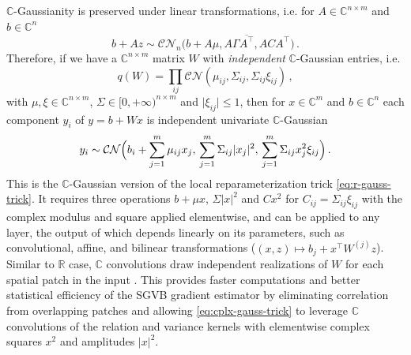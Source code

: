\documentclass[a4paper,10pt,twocolumn]{article}
\newcommand{\real}{\mathbb{R}}
\newcommand{\cplx}{\mathbb{C}}
\newcommand{\conj}[1]{\overline{#1}}
\begin{document}
$\cplx$-Gaussianity is preserved under linear transformations, i.e. for $
  A \in \cplx^{n \times m}
$ and $b \in \cplx^{n}$
\begin{equation}  \label{eq:cn-affine}
  b + A z \sim \mathcal{C}\mathcal{N}_n\bigl(
      b + A\mu, A \Gamma \conj{A^\top}, A C A^\top
    \bigr)
  \,.
\end{equation}
Therefore, if we have a $\cplx^{n\times m}$ matrix $W$ with \emph{independent}
$\cplx$-Gaussian entries, i.e.
\begin{equation}  \label{eq:c-gauss-vi-general}
  q(W)
    = \prod_{ij} \mathcal{CN}(
      \mu_{ij}, \Sigma_{ij}, \Sigma_{ij} \xi_{ij}
    )
  \,,
\end{equation}
with $
  \mu, \xi \in \cplx^{n\times m}
$, $\Sigma \in [0, +\infty)^{n\times m}$ and $
  \lvert \xi_{ij} \rvert \leq 1
$, then for $x \in \cplx^m$ and $b \in \cplx^n$ each component $y_i$ of $y = b + W x$
is independent univariate $\cplx$-Gaussian
\begin{equation}  \label{eq:cplx-gauss-trick}
  y_i
    \sim \mathcal{C}\mathcal{N}
      \Bigl(
        b_i + \sum_{j=1}^m \mu_{ij} x_j,
        \, \sum_{j=1}^m \Sigma_{ij} \lvert x_j \rvert^2,
        \, \sum_{j=1}^m \Sigma_{ij} x_j^2 \xi_{ij}
      \Bigr)
    \,.
\end{equation}
This is the $\cplx$-Gaussian version of the local reparameterization trick \eqref{eq:r-gauss-trick}.
It requires three operations $b + \mu x$, $\Sigma \lvert x \rvert^2$ and $C x^2$ for
$C_{ij} = \Sigma_{ij} \xi_{ij}$ with the complex modulus and square applied elementwise,
and can be applied to any layer, the output of which depends linearly on its parameters,
such as convolutional, affine, and bilinear transformations ($
  (x, z) \mapsto b_j + x^\top W^{(j)} z
$). Similar to $\real$ case, $\cplx$ convolutions draw independent realizations of $W$
for each spatial patch in the input \citep{molchanov_variational_2017}. This provides
faster computations and better statistical efficiency of the SGVB gradient estimator
by eliminating correlation from overlapping patches \citep{kingma_variational_2015} and
allowing \eqref{eq:cplx-gauss-trick} to leverage $\cplx$ convolutions of the relation
and variance kernels with elementwise complex squares $x^2$ and amplitudes $\lvert x \rvert^2$.
\end{document}
